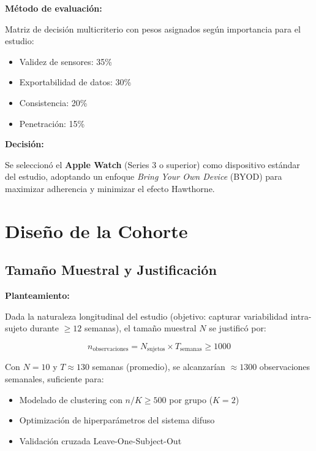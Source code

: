 \documentclass[12pt,letterpaper,twoside]{report}
\begin{document}
\begin{estadisticobox}
\textbf{Método de evaluación:}

Matriz de decisión multicriterio con pesos asignados según importancia para el estudio:
\begin{itemize}[noitemsep]
    \item Validez de sensores: 35\%
    \item Exportabilidad de datos: 30\%
    \item Consistencia: 20\%
    \item Penetración: 15\%
\end{itemize}
\end{estadisticobox}

\begin{decisionbox}
\textbf{Decisión:}

Se seleccionó el \textbf{Apple Watch} (Series 3 o superior) como dispositivo estándar del estudio, adoptando un enfoque \textit{Bring Your Own Device} (BYOD) para maximizar adherencia y minimizar el efecto Hawthorne.
\end{decisionbox}

\section{Diseño de la Cohorte}

\subsection{Tamaño Muestral y Justificación}

\begin{hipotesisbox}
\textbf{Planteamiento:}

Dada la naturaleza longitudinal del estudio (objetivo: capturar variabilidad intra-sujeto durante $\geq 12$ semanas), el tamaño muestral $N$ se justificó por:

\begin{equation}
n_{\text{observaciones}} = N_{\text{sujetos}} \times T_{\text{semanas}} \geq 1000
\end{equation}

Con $N=10$ y $T \approx 130$ semanas (promedio), se alcanzarían $\approx 1300$ observaciones semanales, suficiente para:
\begin{itemize}[noitemsep]
    \item Modelado de clustering con $n/K \geq 500$ por grupo ($K=2$)
    \item Optimización de hiperparámetros del sistema difuso
    \item Validación cruzada Leave-One-Subject-Out
\end{itemize}
\end{hipotesisbox}
\end{document}
